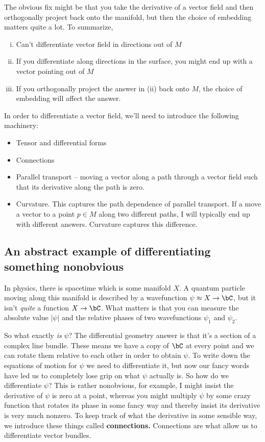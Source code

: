 The obvious fix might be that you take the derivative of a vector field and then orthogonally project back onto the manifold, but then the choice of embedding matters quite a lot. To summarize,
\begin{enumerate}[(i)]
	\item Can't differentiate vector field in directions out of $M$
	\item If you differentiate along directions in the surface, you might end up with a vector pointing out of $M$
	\item If you orthogonally project the answer in (ii) back onto $M$, the choice of embedding will affect the answer.
\end{enumerate}
In order to differentiate a vector field, we'll need to introduce the following machinery:
\begin{itemize}
	\item Tensor and differential forms
	\item Connections
	\item Parallel transport -- moving a vector along a path through a vector field such that its derivative along the path is zero.
	\item Curvature. This captures the path dependence of parallel transport. If a move a vector to a point $p \in M$ along two different paths, I will typically end up with different answers. Curvature captures this difference.
\end{itemize}

\subsection{An abstract example of differentiating something nonobvious}
In physics, there is spacetime which is some manifold $X$. A quantum particle moving along this manifold is described by a wavefunction $\psi \approx X \to \bC$, but it isn't \emph{quite} a function $X\to \bC$. What matters is that you can measure the absolute value $|\psi|$ and the relative phases of two wavefunctions $\psi_1$ and $\psi_2$.

So what exactly \emph{is} $\psi$? The differential geometry answer is that it's a section of a complex line bundle. These means we have a copy of $\bC$ at every point and we can rotate them relative to each other in order to obtain $\psi$. To write down the equations of motion for $\psi$ we need to differentiate it, but now our fancy words have led us to completely lose grip on what $\psi$ actually is. So how do we differentiate $\psi$? This is rather nonobvious, for example, I might insist the derivative of $\psi$ is zero at a point, whereas you might multiply $\psi$ by some crazy function that rotates its phase in some fancy way and thereby insist its derivative is very much nonzero. To keep track of what the derivative in some sensible way, we introduce these things called \textbf{connections.} Connections are what allow us to differentiate vector bundles.

